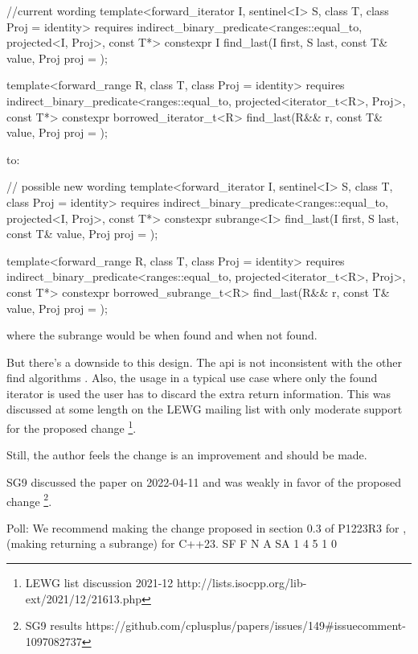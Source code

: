 \documentclass[ebook,10pt,oneside,openany,final]{memoir}
\begin{document}
\begin{itemdecl}
    //current wording
    template<forward_iterator I, sentinel<I> S, class T, class Proj = identity>
      requires indirect_binary_predicate<ranges::equal_to, projected<I, Proj>, const T*>
      constexpr I find_last(I first, S last, const T& value, Proj proj = {});

    template<forward_range R, class T, class Proj = identity>
      requires indirect_binary_predicate<ranges::equal_to, projected<iterator_t<R>, Proj>, const T*>
      constexpr borrowed_iterator_t<R>
        find_last(R&& r, const T& value, Proj proj = {});
\end{itemdecl}

to:

\begin{itemdecl}
    // possible new wording
    template<forward_iterator I, sentinel<I> S, class T, class Proj = identity>
      requires indirect_binary_predicate<ranges::equal_to, projected<I, Proj>, const T*>
      constexpr subrange<I> find_last(I first, S last, const T& value, Proj proj = {});

    template<forward_range R, class T, class Proj = identity>
      requires indirect_binary_predicate<ranges::equal_to, projected<iterator_t<R>, Proj>, const T*>
      constexpr borrowed_subrange_t<R>
        find_last(R&& r, const T& value, Proj proj = {});
\end{itemdecl}

where the subrange would be \tcode{[i, last)} when found and \tcode{[last, last)}
when not found.

But there's a downside to this design.  The api is not inconsistent with the other
find algorithms . Also, the usage in a typical use case
where only the found iterator is used the user has to discard the extra return
information. This was discussed at some length on the LEWG mailing list with only moderate support for the proposed change \footnote{LEWG list discussion 2021-12 http://lists.isocpp.org/lib-ext/2021/12/21613.php}.

Still, the author feels the change is an improvement and should be made.

SG9 discussed the paper on 2022-04-11 and was weakly in favor of the proposed change \footnote{SG9 results https://github.com/cplusplus/papers/issues/149#issuecomment-1097082737}.

Poll: We recommend making the change proposed in section 0.3 of P1223R3 for , (making  returning a subrange) for C++23.
SF 	F 	N 	A 	SA
1 	4 	5 	1 	0
\end{document}
